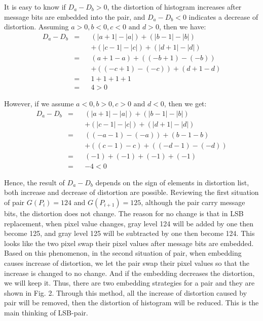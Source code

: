 \documentclass[a4paper,10pt,twocolumn]{article}
\begin{document}
It is easy to know if $D_a - D_b > 0$, the distortion of histogram increases after
message bits are embedded into the pair, and $D_a - D_b < 0$ indicates a
decrease of distortion. Assuming $a>0, b<0, c<0 \text{ and } d>0$, then we
have:
\begin{align*}
 D_a - D_b &= & & (|a+1| - |a|) + (|b-1|-|b|) \\
           &  & & + (|c-1|-|c|) + (|d+1|-|d|) \\
           &= & & (a+1-a) + ((-b+1)-(-b)) \\
           &  & & + ((-c+1)-(-c)) + (d+1-d) \\
           &= & & 1+1+1+1 \\
           &= & & 4 > 0
\end{align*}


However, if we assume $a<0, b>0, c>0 \text{ and } d<0$, then we get:
\begin{align*}
 D_a - D_b &= & & (|a+1| - |a|) + (|b-1|-|b|) \\ 
           &  & & + (|c-1|-|c|) + (|d+1|-|d|) \\
           &= & & ((-a-1)-(-a)) + (b-1-b) \\
           &  & & + ((c-1)-c) + ((-d-1) - (-d))\\
           &= & & (-1)+(-1)+(-1)+(-1) \\
           &= & & -4 < 0
\end{align*}


Hence, the result of $D_a - D_b$ depends on the sign of elements in distortion list,
both increase and decrease of distortion are possible. Reviewing the first situation
of pair $G(P_i) = 124$ and $G(P_{i+1})=125$, although the pair carry message bits,
the distortion does not change. The reason for no change is that in LSB replacement,
when pixel value changes, gray level 124 will be added by one then become 125, and
gray level 125 will be subtracted by one then become 124. This looks like the two pixel
swap their pixel values after message bits are embedded. Based on this phenomenon, in
the second situation of pair, when embedding causes increase of distortion, we let the
pair swap their pixel values so that the increase is changed to no change. And if the
embedding decreases the distortion, we will keep it. Thus, there are two embedding
strategies for a pair and they are shown in Fig. 2. Through this method, all the
increase of distortion caused by pair will be removed, then the distortion of histogram
will be reduced. This is the main thinking of LSB-pair.
\end{document}
